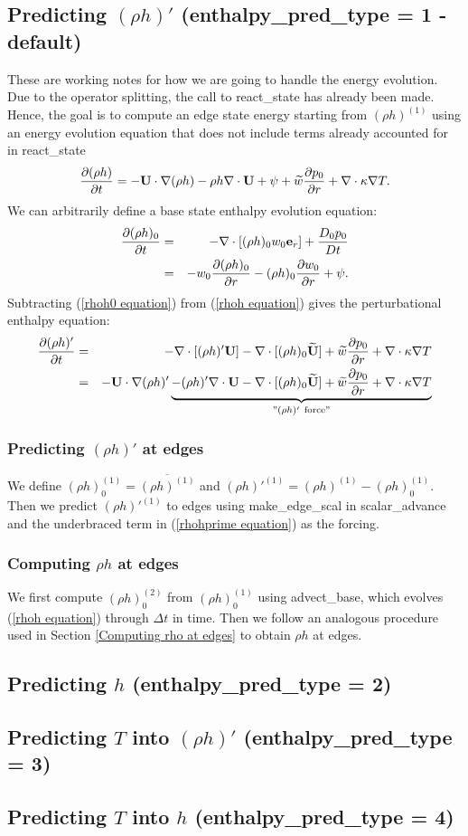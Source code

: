 \documentclass[11pt]{article}
\def\eb    {{\bf e}}
\def\Ub    {{\bf U}}
\def\Ubt   {\widetilde{\bf U}}
\def\wt    {\widetilde{w}}
\begin{document}
\subsection{Predicting $(\rho h)'$ (enthalpy\_pred\_type = 1 - default)}
These are working notes for how we are going to handle the energy evolution.  Due to the 
operator splitting, the call to react\_state has already been made.  Hence, the goal is to 
compute an edge state energy starting from $(\rho h)^{(1)}$ using an energy evolution 
equation that does not include terms already accounted for in react\_state
\begin{equation}
\frac{\partial(\rho h)}{\partial t} = -\Ub\cdot\nabla(\rho h) - \rho h\nabla\cdot\Ub 
+ \psi + \wt\frac{\partial p_0}{\partial r} + \nabla\cdot\kappa\nabla T. \label{rhoh equation}
\end{equation}
We can arbitrarily define a base state enthalpy evolution equation:
\begin{eqnarray}
\frac{\partial(\rho h)_0}{\partial t} &=& -\nabla\cdot[(\rho h)_0 w_0\eb_r] 
+ \frac{D_0p_0}{Dt} \nonumber \\
&=& -w_0\frac{\partial(\rho h)_0}{\partial r} - (\rho h)_0\frac{\partial w_0}{\partial r} 
+ \psi.\label{rhoh0 equation}
\end{eqnarray}
Subtracting (\ref{rhoh0 equation}) from (\ref{rhoh equation}) gives the perturbational 
enthalpy equation:
\begin{eqnarray}
\frac{\partial(\rho h)'}{\partial t} &=& -\nabla\cdot[(\rho h)'\Ub] 
- \nabla\cdot[(\rho h)_0\Ubt] + \wt\frac{\partial p_0}{\partial r} 
+ \nabla\cdot\kappa\nabla T\nonumber \\
&=& -\Ub\cdot\nabla(\rho h)' \underbrace{- (\rho h)'\nabla\cdot\Ub 
- \nabla\cdot[(\rho h)_0\Ubt] + \wt\frac{\partial p_0}{\partial r}
+ \nabla\cdot\kappa\nabla T}_{"(\rho h)' ~ \text{force}"} \label{rhohprime equation}
\end{eqnarray}
\subsubsection{Predicting $(\rho h)'$ at edges}\label{Predicting rhohprime at edges}
We define $(\rho h)_0^{(1)} = \overline{(\rho h)^{(1)}}$  and 
$(\rho h)'^{(1)} = (\rho h)^{(1)}-(\rho h)_0^{(1)}$.  Then we predict $(\rho h)'^{(1)}$ to 
edges using make\_edge\_scal in scalar\_advance and the underbraced term in 
(\ref{rhohprime equation}) as the 
forcing.
\subsubsection{Computing $\rho h$ at edges}
We first compute $(\rho h)_0^{(2)}$ from $(\rho h)_0^{(1)}$ using advect\_base, which evolves 
(\ref{rhoh equation}) through $\Delta t$ in time.  Then we follow an analogous procedure 
used in Section \ref{Computing rho at edges} to obtain $\rho h$ at edges.
\subsection{Predicting $h$ (enthalpy\_pred\_type = 2)}
\subsection{Predicting $T$ into $(\rho h)'$ (enthalpy\_pred\_type = 3)}
\subsection{Predicting $T$ into $h$ (enthalpy\_pred\_type = 4)}
\end{document}
